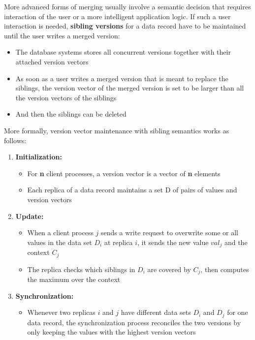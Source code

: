 More advanced forms of merging usually involve a semantic decision that requires interaction of the user or a more intelligent application logic. If such a user interaction is needed, \textbf{sibling versions} for a data record have to be maintained until the user writes a merged version:
\begin{itemize}
    \item The database systems stores all concurrent versions together with their attached version vectors
    \item As soon as a user writes a merged version that is meant to replace the siblings, the version vector of the merged version is set to be larger than all the version vectors of the siblings
    \item And then the siblings can be deleted
\end{itemize}

More formally, version vector maintenance with sibling semantics works as follows:
\begin{enumerate}
    \item \textbf{Initialization:}
    \begin{itemize}
        \item For \textbf{n} client processes, a version vector is a vector of \textbf{n} elements
        \item Each replica of a data record maintains a set D of pairs of values and version vectors
    \end{itemize}
    \item \textbf{Update:}
    \begin{itemize}
        \item When a client process $j$ sends a write request to overwrite some or all values in the data set $D_i$ at replica $i$, it sends the new value $val_j$ and the context $C_j$
        \item The replica checks which siblings in $D_i$ are covered by $C_j$, then computes the maximum over the context
    \end{itemize}
    \item \textbf{Synchronization:}
    \begin{itemize}
        \item Whenever two replicas $i$ and $j$ have different data sets $D_i$ and $D_j$ for one data record, the synchronization process reconciles the two versions by only keeping the values with the highest version vectors
    \end{itemize}
\end{enumerate}


